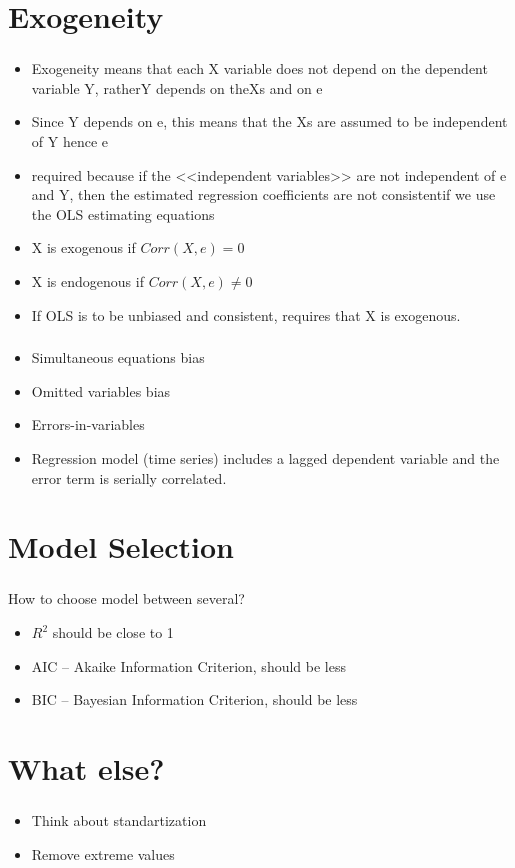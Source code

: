\documentclass[t, 11pt]{beamer}
\begin{document}
	\section{Exogeneity}
\begin{frame} 
	\frametitle{\insertsection} 
	
	\begin{itemize}
		\item Exogeneity means that each X variable does not depend on the dependent variable Y, ratherY depends on theXs and on e
		\item Since Y depends on e, this means that the Xs are assumed to be independent of Y hence e
		\item required because if the <<independent variables>> are not independent of e and Y, then the estimated regression coefficients are not consistentif we use the OLS estimating equations
		
		\item X is exogenous if $Corr(X, e) = 0$
		\item X is endogenous if $Corr(X, e) \neq 0$
		\item If OLS is to be unbiased and consistent, requires that X is exogenous.
	\end{itemize}
	
\end{frame}	

\begin{frame} 
	\frametitle{\insertsection} 
	
	\begin{itemize}
		\item Simultaneous equations bias
		\item Omitted variables bias
		\item Errors-in-variables
		\item Regression model (time series) includes a lagged dependent variable and the error term is serially correlated.
	\end{itemize}
	
\end{frame}	

	\section{Model Selection}
\begin{frame} 
	\frametitle{\insertsection} 
	How to choose model between several?
	\begin{itemize}
		\item $R^2$ should be close to 1 
		\item AIC – Akaike Information Criterion, should be less
		\item BIC – Bayesian Information Criterion, should be less
		\end{itemize}
\end{frame}	

\section{What else?}
\begin{frame} 
	\frametitle{\insertsection} 
	\begin{itemize}
		\item Think about standartization
		\item Remove extreme values
	\end{itemize}
\end{frame}	
	
\end{document}
